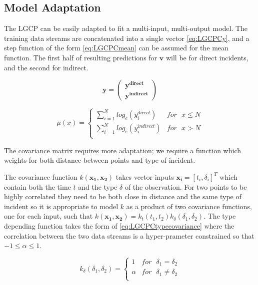 \documentclass[a4paper,11pt]{report}
\begin{document}
\subsection{Model Adaptation}

The LGCP can be easily adapted to fit a multi-input, multi-output model. The training data streams are concatenated into a single vector \ref{eq:LGCPCy}, and a step function of the form \ref{eq:LGCPCmean} can be assumed for the mean function. The first half of resulting predictions for \(\mathbf{v}\) will be for direct incidents, and the second for indirect.

\begin{equation} \label{eq:LGCPCy}
\mathbf{y} = \left( \begin{array}{cc}
\mathbf{y^{direct}} \\
\mathbf{y^{indirect}} \end{array} \right)
\end{equation}

\begin{equation} \label{eq:LGCPCmean}
\mu (x) = \begin{cases}  
\displaystyle \sum_{i=1}^{N} log_e(y_i^{direct}) & for \text{ }x\le N \\
\displaystyle \sum_{i=1}^{N}log_e(y_i^{indirect}) & for \text{ }x>N \\ \end{cases}
\end{equation}

The covariance matrix requires more adaptation; we require a function which weights for both distance between points and type of incident. 

The covariance function \(k(\mathbf{x_1}, \mathbf{x_2})\) takes vector inputs \(\mathbf{x_i} = [t_i,\delta_i]^T\) which contain both the time \(t\) and the type \(\delta\) of the observation. For two points to be highly correlated they need to be both close in distance and the same type of incident so it is appropriate to model \(k\) as a product of two covariance functions, one for each input, such that \(k(\mathbf{x_1}, \mathbf{x_2}) = k_t(t_1,t_2) k_{\delta}(\delta_1,\delta_2)\). The type depending function takes the form of \ref{eq:LGCPCtypecovariance} where the correlation between the two data streams is a hyper-prameter constrained so that \(-1\le \alpha \le 1\).

\begin{equation} \label{eq:LGCPCtypecovariance}
k_{\delta}(\delta_1,\delta_2) = \begin{cases}
1 & for \text{ } \delta_1 = \delta_2 \\
\alpha & for \text{ } \delta_1 \neq \delta_2 \\ \end{cases}
\end{equation}
\end{document}
